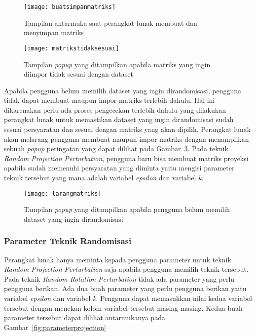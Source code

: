 \begin{figure}
	\centering
	\texttt{[image: buatsimpanmatriks]}
	\caption{Tampilan antarmuka saat perangkat lunak membuat dan menyimpan matriks}
	\label{fig:buatsimpanmatriks}
\end{figure}

\begin{figure}
	\centering
	\texttt{[image: matrikstidaksesuai]}
	\caption{Tampilan \textit{popup} yang ditampilkan apabila matriks yang ingin diimpor tidak sesuai dengan dataset}
	\label{fig:matrikstidaksesuai}
\end{figure}

Apabila pengguna belum memilih dataset yang ingin dirandomisasi, pengguna tidak dapat membuat maupun impor matriks terlebih dahulu. Hal ini dikarenakan perlu ada proses pengecekan terlebih dahulu yang dilakukan perangkat lunak untuk memastikan dataset yang ingin dirandomisasi sudah sesuai persyaratan dan sesuai dengan matriks yang akan dipilih. Perangkat lunak akan melarang pengguna membuat maupun impor matriks dengan menampilkan sebuah \textit{popup} peringatan yang dapat dilihat pada Gambar~\ref{fig:larangmatriks}. Pada teknik \textit{Random Projection Perturbation}, pengguna baru bisa membuat matriks proyeksi apabila sudah memenuhi persyaratan yang diminta yaitu mengisi parameter teknik tersebut yang mana adalah variabel \textit{epsilon} dan variabel \textit{k}.

\begin{figure}
	\centering
	\texttt{[image: larangmatriks]}
	\caption{Tampilan \textit{popup} yang ditampilkan apabila pengguna belum memilih dataset yang ingin dirandomisasi}
	\label{fig:larangmatriks}
\end{figure}

\subsubsection{Parameter Teknik Randomisasi}
\label{sec:parameterteknik}

Perangkat lunak hanya meminta kepada pengguna parameter untuk teknik \textit{Random Projection Perturbation} saja apabila pengguna memilih teknik tersebut. Pada teknik \textit{Random Rotation Perturbation} tidak ada parameter yang perlu pengguna berikan. Ada dua buah parameter yang perlu pengguna berikan yaitu variabel \textit{epsilon} dan variabel \textit{k}. Pengguna dapat memasukkan nilai kedua variabel tersebut dengan menekan kolom variabel tersebut masing-masing. Kedua buah parameter tersebut dapat dilihat antarmukanya pada Gambar~\ref{fig:parameterprojection}

